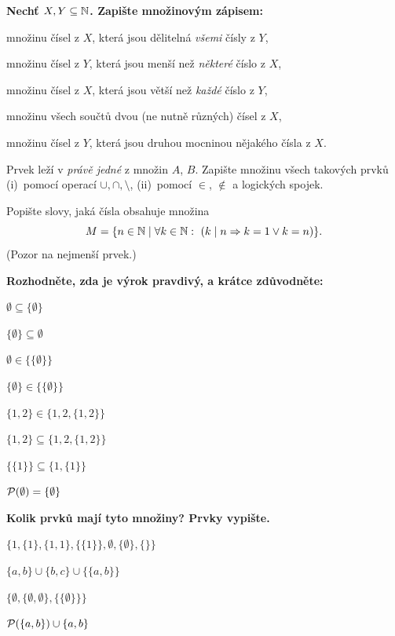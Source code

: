 \documentclass[11pt,a4paper]{article}
\begin{document}
\Needspace*{10.6cm}
\textbf{Nechť $X,Y\subseteq\mathbb N$. Zapište množinovým zápisem:}
\begin{pol}
  \item množinu čísel z $X$, která jsou dělitelná \emph{všemi} čísly z $Y$,
  \item množinu čísel z $Y$, která jsou menší než \emph{některé} číslo z $X$,
  \item množinu čísel z $X$, která jsou větší než \emph{každé} číslo z $Y$,
  \item množinu všech součtů dvou (ne nutně různých) čísel z $X$,
  \item množinu čísel z $Y$, která jsou druhou mocninou nějakého čísla z $X$.
\end{pol}
\misto{7.2cm}

\Needspace*{7.0cm}
Prvek leží v \emph{právě jedné} z množin $A$, $B$. Zapište množinu všech takových prvků (i)~pomocí operací $\cup,\cap,\setminus$, (ii)~pomocí $\in$, $\notin$ a logických spojek.
\misto{3.6cm}

\Needspace*{6.6cm}
Popište slovy, jaká čísla obsahuje množina
\[M=\{n\in\mathbb N\mid \forall k\in\mathbb N:\ (k\mathrel{\mid} n\Rightarrow k=1\lor k=n)\}.\]
(Pozor na nejmenší prvek.)
\misto{3.2cm}


\Needspace*{8.8cm}
\textbf{Rozhodněte, zda je výrok pravdivý, a krátce zdůvodněte:}
\begin{dvasl}
  \item $\emptyset\subseteq\{\emptyset\}$
  \item $\{\emptyset\}\subseteq\emptyset$
  \item $\emptyset\in\{\{\emptyset\}\}$
  \item $\{\emptyset\}\in\{\{\emptyset\}\}$
  \item $\{1,2\}\in\{1,2,\{1,2\}\}$
  \item $\{1,2\}\subseteq\{1,2,\{1,2\}\}$
  \item $\{\{1\}\}\subseteq\{1,\{1\}\}$
  \item $\mathcal P(\emptyset)=\{\emptyset\}$
\end{dvasl}
\misto{5.4cm}

\Needspace*{8.8cm}
\textbf{Kolik prvků mají tyto množiny? Prvky vypište.}
\begin{pol}
  \item $\{1,\{1\},\{1,1\},\{\{1\}\},\emptyset,\{\emptyset\},\{\}\}$
  \item $\{a,b\}\cup\{b,c\}\cup\{\{a,b\}\}$
  \item $\{\emptyset,\{\emptyset,\emptyset\},\{\{\emptyset\}\}\}$
  \item $\mathcal P(\{a,b\})\cup\{a,b\}$
\end{pol}
\misto{5.4cm}
\end{document}
